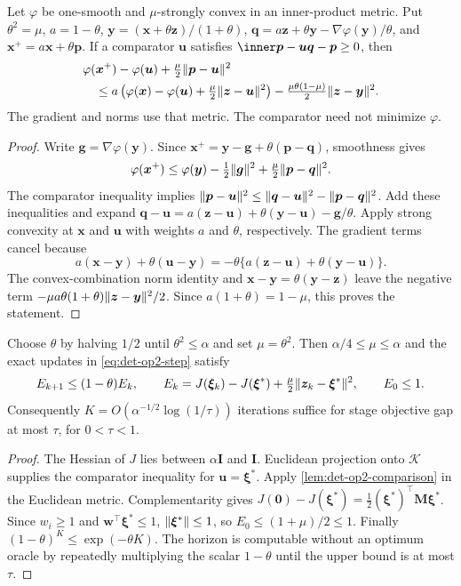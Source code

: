 \begin{lemma}
\label{lem:det-op2-comparison}
Let $\varphi$ be one-smooth and $\mu$-strongly convex in an inner-product
metric. Put $\theta^2=\mu$, $a=1-\theta$,
$\bm{y}=(\bm{x}+\theta\bm{z})/(1+\theta)$,
$\bm{q}=a\bm{z}+\theta\bm{y}-\nabla\varphi(\bm{y})/\theta$, and
$\bm{x}^{+}=a\bm{x}+\theta\bm{p}$. If a comparator $\bm{u}$ satisfies
$\ip{\bm{p}-\bm{u}}{\bm{q}-\bm{p}}\geq0$, then
\begin{align*}
 &\varphi(\bm{x}^{+})-\varphi(\bm{u})
                  +\tfrac\mu2\lVert\bm{p}-\bm{u}\rVert^2\\
 &\quad\leq a\left(\varphi(\bm{x})-\varphi(\bm{u})
                  +\tfrac\mu2\lVert\bm{z}-\bm{u}\rVert^2\right)
       -\tfrac{\mu\theta(1-\mu)}2\lVert\bm{z}-\bm{y}\rVert^2.
\end{align*}
The gradient and norms use that metric. The comparator need not minimize
$\varphi$.
\end{lemma}
\begin{proof}
Write $\bm{g}=\nabla\varphi(\bm{y})$. Since
$\bm{x}^{+}=\bm{y}-\bm{g}+\theta(\bm{p}-\bm{q})$, smoothness gives
\[
 \varphi(\bm{x}^{+})\leq\varphi(\bm{y})-\tfrac12\lVert\bm{g}\rVert^2
                                  +\tfrac\mu2\lVert\bm{p}-\bm{q}\rVert^2.
\]
The comparator inequality implies
$\lVert\bm{p}-\bm{u}\rVert^2\leq\lVert\bm{q}-\bm{u}\rVert^2
-\lVert\bm{p}-\bm{q}\rVert^2$. Add these inequalities and expand
$\bm{q}-\bm{u}=a(\bm{z}-\bm{u})+\theta(\bm{y}-\bm{u})-\bm{g}/\theta$.
Apply strong convexity at $\bm{x}$ and $\bm{u}$ with weights $a$ and
$\theta$, respectively. The gradient terms cancel because
\[
 a(\bm{x}-\bm{y})+\theta(\bm{u}-\bm{y})
 =-\theta\{a(\bm{z}-\bm{u})+\theta(\bm{y}-\bm{u})\}.
\]
The convex-combination norm identity and
$\bm{x}-\bm{y}=\theta(\bm{y}-\bm{z})$ leave the negative term
$-\mu a\theta(1+\theta)\lVert\bm{z}-\bm{y}\rVert^2/2$.
Since $a(1+\theta)=1-\mu$, this proves the statement.
\end{proof}

\begin{theorem}
\label{thm:det-op2-stage}
Choose $\theta$ by halving $1/2$ until $\theta^2\leq\alpha$ and set
$\mu=\theta^2$. Then $\alpha/4\leq\mu\leq\alpha$ and the exact updates
in \eqref{eq:det-op2-step} satisfy
\[
 E_{k+1}\leq(1-\theta)E_k,\qquad
 E_k=J(\bm{\xi}_k)-J(\bm{\xi}^*)
          +\tfrac\mu2\lVert\bm{z}_k-\bm{\xi}^*\rVert^2,
 \qquad E_0\leq1.
\]
Consequently $K=O(\alpha^{-1/2}\log(1/\tau))$ iterations suffice for
stage objective gap at most $\tau$, for $0<\tau<1$.
\end{theorem}
\begin{proof}
The Hessian of $J$ lies between $\alpha\bm{I}$ and $\bm{I}$.
Euclidean projection onto $\mathcal K$ supplies the comparator inequality
for $\bm{u}=\bm{\xi}^*$. Apply
\cref{lem:det-op2-comparison} in the Euclidean metric.
Complementarity gives
$J(\bm{0})-J(\bm{\xi}^*)=\tfrac12(\bm{\xi}^*)^{\top}\bm{M}\bm{\xi}^*$.
Since $w_i\geq1$ and $\bm{w}^{\top}\bm{\xi}^*\leq1$,
$\lVert\bm{\xi}^*\rVert\leq1$, so $E_0\leq(1+\mu)/2\leq1$.
Finally $(1-\theta)^K\leq\exp(-\theta K)$.
The horizon is computable without an optimum oracle by repeatedly
multiplying the scalar $1-\theta$ until the upper bound is at most $\tau$.
\end{proof}
